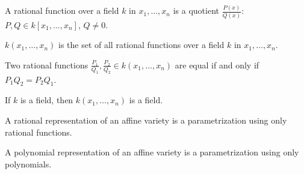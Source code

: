 \documentclass[../main.tex]{subfiles}
\begin{document}
\begin{definition}
A rational function over a field $k$ in $x_1,\hdots, x_n$ is a quotient $\frac{P(x)}{Q(x)}$: $P,Q \in k[x_1,\hdots ,x_n]$, $Q\ne 0$.
\end{definition}

\begin{definition}
$k(x_1,\hdots ,x_n)$ is the set of all rational functions over a field $k$ in $x_1,\hdots, x_n$.
\end{definition}

\begin{definition}
Two rational functions $\frac{P_1}{Q_1}, \frac{P_2}{Q_2} \in k(x_1,\hdots ,x_n)$ are equal if and only if $P_1Q_2 = P_2Q_1$.
\end{definition}

\begin{theorem}
If $k$ is a field, then $k(x_1,\hdots ,x_n)$ is a field.
\end{theorem}

\begin{definition}
A rational representation of an affine variety is a parametrization using only rational functions.
\end{definition}

\begin{definition}
A polynomial representation of an affine variety is a parametrization using only polynomials.
\end{definition}
\end{document}
